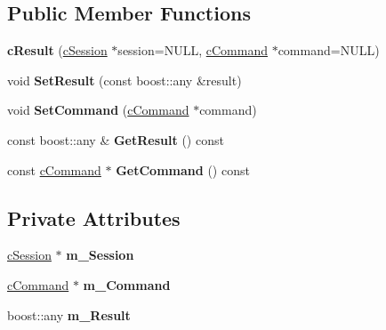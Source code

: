 \subsection*{\-Public \-Member \-Functions}
\begin{DoxyCompactItemize}
\item 
\hypertarget{classengine_1_1cResult_a31310dd255e30fdaeb34aa0e82c489f3}{{\bfseries c\-Result} (\hyperlink{classengine_1_1cSession}{c\-Session} $\ast$session=\-N\-U\-L\-L, \hyperlink{classengine_1_1cCommand}{c\-Command} $\ast$command=\-N\-U\-L\-L)}\label{classengine_1_1cResult_a31310dd255e30fdaeb34aa0e82c489f3}

\item 
\hypertarget{classengine_1_1cResult_ad72c10e84728768e45adbe9a653e4295}{void {\bfseries \-Set\-Result} (const boost\-::any \&result)}\label{classengine_1_1cResult_ad72c10e84728768e45adbe9a653e4295}

\item 
\hypertarget{classengine_1_1cResult_ae9d0c2817585874e55a9ba8483e9d0b7}{void {\bfseries \-Set\-Command} (\hyperlink{classengine_1_1cCommand}{c\-Command} $\ast$command)}\label{classengine_1_1cResult_ae9d0c2817585874e55a9ba8483e9d0b7}

\item 
\hypertarget{classengine_1_1cResult_ab1b5a9a971a31c6bfe9c1deeab868476}{const boost\-::any \& {\bfseries \-Get\-Result} () const }\label{classengine_1_1cResult_ab1b5a9a971a31c6bfe9c1deeab868476}

\item 
\hypertarget{classengine_1_1cResult_aa414e0f8b867fa54c6e836f0a67517b0}{const \hyperlink{classengine_1_1cCommand}{c\-Command} $\ast$ {\bfseries \-Get\-Command} () const }\label{classengine_1_1cResult_aa414e0f8b867fa54c6e836f0a67517b0}

\end{DoxyCompactItemize}
\subsection*{\-Private \-Attributes}
\begin{DoxyCompactItemize}
\item 
\hypertarget{classengine_1_1cResult_ab4a2a6e829775978c141dc4f18398321}{\hyperlink{classengine_1_1cSession}{c\-Session} $\ast$ {\bfseries m\-\_\-\-Session}}\label{classengine_1_1cResult_ab4a2a6e829775978c141dc4f18398321}

\item 
\hypertarget{classengine_1_1cResult_ae5500a8cd5d5c860c9c3c71a9bd687f1}{\hyperlink{classengine_1_1cCommand}{c\-Command} $\ast$ {\bfseries m\-\_\-\-Command}}\label{classengine_1_1cResult_ae5500a8cd5d5c860c9c3c71a9bd687f1}

\item 
\hypertarget{classengine_1_1cResult_a445a8b5495ec68e809fe85b5876a5bc7}{boost\-::any {\bfseries m\-\_\-\-Result}}\label{classengine_1_1cResult_a445a8b5495ec68e809fe85b5876a5bc7}

\end{DoxyCompactItemize}


